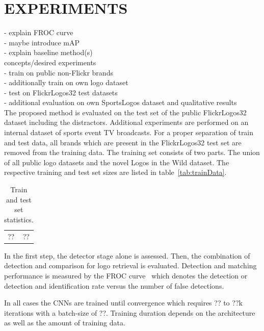 \documentclass[a4paper,twoside]{article}
\begin{document}
\section{\uppercase{Experiments}}
\noindent- explain FROC curve \\
- maybe introduce mAP \\
- explain baseline method(s) \\
concepts/desired experiments \\
- train on public non-Flickr brands \\
- additionally train on own logo dataset \\
- test on FlickrLogos32 test datasets \\

- additional evaluation on own SportsLogos dataset and qualitative results \\

The proposed method is evaluated on the test set of the public FlickrLogos32 dataset including the distractors. Additional experiments are performed on an internal dataset of sports event TV broadcasts. For a proper separation of train and test data, all brands which are present in the FlickrLogos32 test set are removed from the training data. The training set consists of two parts. The union of all public logo datasets and the novel Logos in the Wild dataset. The respective training and test set sizes are listed in table~\ref{tab:trainData}.
%
\begin{table}[t]
\centering
\begingroup	
\setlength{\tabcolsep}{6pt}
\caption{Train and test set statistics.}
\label{tab:trainTestStatistics}
\begin{small}
\begin{tabular}{l|c}
?? & ?? %
\end{tabular}
\end{small}
\endgroup
\end{table}

In the first step, the detector stage alone is assessed. Then, the combination of detection and comparison for logo retrieval is evaluated. 
Detection and matching performance is measured by the \ac{FROC} curve~\cite{miller1969} which denotes the detection or detection and identification rate versus the number of false detections.

In all cases the \acp{CNN} are trained until convergence which requires ?? to ??k iterations with a batch-size of ??. Training duration depends on the architecture as well as the amount of training data.
\end{document}

